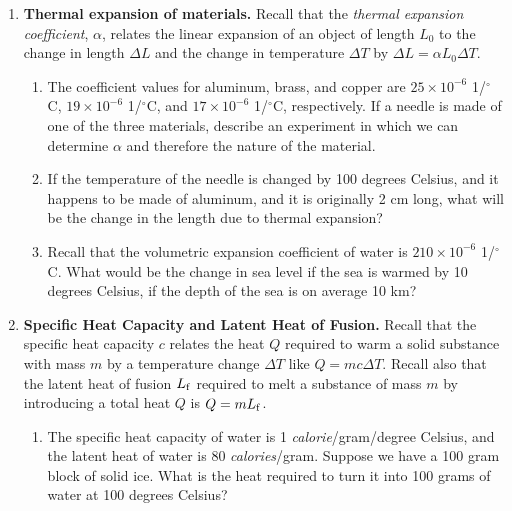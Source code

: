 \documentclass[10pt]{article}
\begin{document}
\maketitle

\begin{enumerate}
\item \textbf{Thermal expansion of materials.}  Recall that the \textit{thermal expansion coefficient}, $\alpha$, relates the linear expansion of an object of length $L_0$ to the change in length $\Delta L$ and the change in temperature $\Delta T$ by $\Delta L = \alpha L_0 \Delta T$.
\begin{enumerate}
\item The coefficient values for aluminum, brass, and copper are $25 \times 10^{-6}$ 1/$^{\circ}$C, $19 \times 10^{-6}$ 1/$^{\circ}$C, and $17 \times 10^{-6}$ 1/$^{\circ}$C, respectively.  If a needle is made of one of the three materials, describe an experiment in which we can determine $\alpha$ and therefore the nature of the material. \\ \vspace{2cm}
\item If the temperature of the needle is changed by 100 degrees Celsius, and it happens to be made of aluminum, and it is originally 2 cm long, what will be the change in the length due to thermal expansion? \\ \vspace{2cm}
\item Recall that the volumetric expansion coefficient of water is $210 \times 10^{-6}$ 1/$^{\circ}$C.  What would be the change in sea level if the sea is warmed by 10 degrees Celsius, if the depth of the sea is on average 10 km? \\ \vspace{2cm}
\end{enumerate}
\item \textbf{Specific Heat Capacity and Latent Heat of Fusion.}  Recall that the specific heat capacity $c$ relates the heat $Q$ required to warm a solid substance with mass $m$ by a temperature change $\Delta T$ like $Q = m c \Delta T$.  Recall also that the latent heat of fusion $L_{\rm f}$ required to melt a substance of mass $m$ by introducing a total heat $Q$ is $Q = m L_{\rm f}$.
\begin{enumerate}
\item The specific heat capacity of water is 1 \textit{calorie}/gram/degree Celsius, and the latent heat of water is 80 \textit{calories}/gram.  Suppose we have a 100 gram block of solid ice.  What is the heat required to turn it into 100 grams of water at 100 degrees Celsius? \\ \vspace{2cm}

\end{enumerate}
\end{enumerate}
\end{document}

